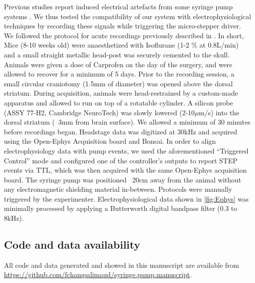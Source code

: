 Previous studies report induced electrical artefacts from some syringe pump systems \citep{Amarante2019}. We thus tested the compatibility of our system with electrophysiological techniques by recording these signals while triggering the micro-stepper driver. 
We followed the protocol for acute recordings previously described in \cite{Cruz2022}. In short, Mice (8-10 weeks old) were anaesthetized with Isoflurane (1-2 \% at 0.8L/min) and a small straight metallic head-post was securely cemented to the skull. Animals were given a dose of Carprofen on the day of the surgery, and were allowed to recover for a minimum of 5 days. Prior to the recording session, a small circular craniotomy (1.5mm of diameter) was opened above the dorsal striatum. During acquisition, animals were head-restrained by a custom-made apparatus and allowed to run on top of a rotatable cylinder. A silicon probe (ASSY 77-H2, Cambridge NeuroTech) was slowly lowered (2-10$\mu$m/s) into the dorsal striatum (~3mm from brain surface). We allowed a minimum of 30 minutes before recordings began. Headstage data was digitized at 30kHz and acquired using the Open-Ephys Acquisition board and Bonsai. In order to align electrophysiology data with pump events, we used the aforementioned “Triggered Control” mode and configured one of the controller’s outputs to report STEP events via TTL, which was then acquired with the same Open-Ephys acquisition board. The syringe pump was positioned ~20cm away from the animal without any electromagnetic shielding material in-between. Protocols were manually triggered by the experimenter.
Electrophysiological data shown in \ref{fig:Ephys} was minimally processed by applying a Butterworth digital bandpass filter (0.3 to 8kHz).

\subsection{Code and data availability}
All code and data generated and showed in this manuscript are available from \url{https://github.com/fchampalimaud/syringe.pump.manuscript}.


